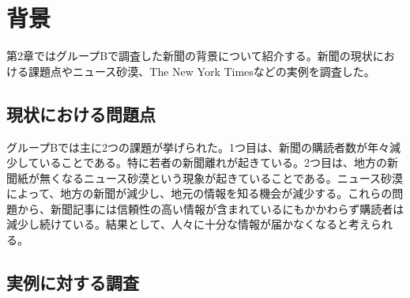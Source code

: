 \chapter{背景}
第2章ではグループBで調査した新聞の背景について紹介する。新聞の現状における課題点やニュース砂漠、The New York Timesなどの実例を調査した。
\section{現状における問題点}
グループBでは主に2つの課題が挙げられた。1つ目は、新聞の購読者数が年々減少していることである。特に若者の新聞離れが起きている。2つ目は、地方の新聞紙が無くなるニュース砂漠という現象が起きていることである。ニュース砂漠によって、地方の新聞が減少し、地元の情報を知る機会が減少する。これらの問題から、新聞記事には信頼性の高い情報が含まれているにもかかわらず購読者は減少し続けている。結果として、人々に十分な情報が届かなくなると考えられる。

\section{実例に対する調査}
